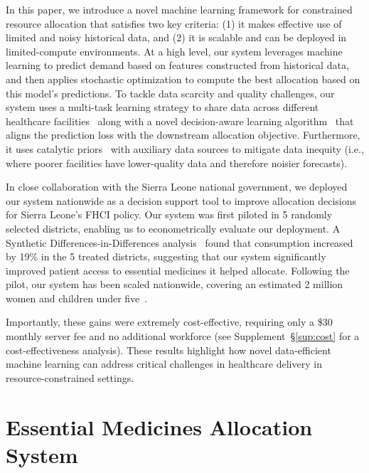 \documentclass[12pt]{article}
\begin{document}
In this paper, we introduce a novel machine learning framework for constrained resource allocation that satisfies two key criteria: (1) it makes effective use of limited and noisy historical data, and (2) it is scalable and can be deployed in limited-compute environments. At a high level, our system leverages machine learning to predict demand based on features constructed from historical data, and then applies stochastic optimization to compute the best allocation based on this model's predictions. To tackle data scarcity and quality challenges, our system uses a multi-task learning strategy to share data across different healthcare facilities~\cite{caruana1997multitask} along with a novel decision-aware learning algorithm~\cite{donti2017task,elmachtoub2022smart,bertsimas2020predictive,wilder2019melding, wang2020automatically, shahdecision} that aligns the prediction loss with the downstream allocation objective. Furthermore, it uses catalytic priors~\cite{huang2020catalytic} with auxiliary data sources to mitigate data inequity (i.e., where poorer facilities have lower-quality data and therefore noisier forecasts).

In close collaboration with the Sierra Leone national government, we deployed our system nationwide as a decision support tool to improve allocation decisions for Sierra Leone's FHCI policy. Our system was first piloted in 5 randomly selected districts, enabling us to econometrically evaluate our deployment. A Synthetic Differences-in-Differences analysis~\cite{arkhangelsky2021synthetic} found that consumption increased by 19\% in the 5 treated districts, suggesting that our system significantly improved patient access to essential medicines it helped allocate. Following the pilot, our system has been scaled nationwide, covering an estimated 2 million women and children under five~\cite{WorldBank2025,UNICEF_2025_SierraLeoneData}.

Importantly, these gains were extremely cost-effective, requiring only a \$30 monthly server fee and no additional workforce (see Supplement~\S\ref{sup:cost} for a cost-effectiveness analysis). These results highlight how novel data-efficient machine learning can address critical challenges in healthcare delivery in resource-constrained settings.


\section{Essential Medicines Allocation System}
\label{allocation}
\end{document}
